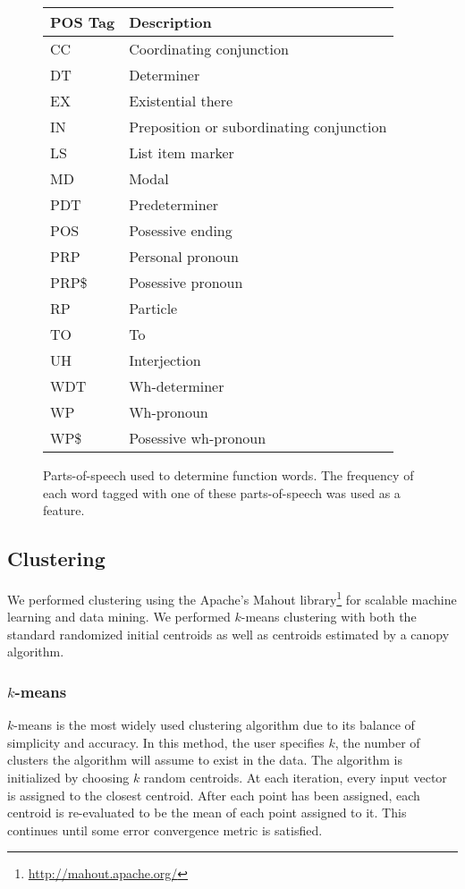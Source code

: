\documentclass[12pt]{article}
\begin{document}
\begin{figure}[h!]
\begin{center}
\begin{tabular}{ll}
\hline
{\bf POS Tag} & {\bf Description} \\ \hline
CC & Coordinating conjunction \\
DT & Determiner \\ 
EX & Existential there \\
IN & Preposition or subordinating conjunction \\
LS & List item marker \\
MD & Modal \\
PDT & Predeterminer \\
POS & Posessive ending \\
PRP & Personal pronoun \\
PRP\$ & Posessive pronoun \\
RP & Particle \\
TO & To \\
UH & Interjection \\
WDT & Wh-determiner \\
WP & Wh-pronoun \\
WP\$ & Posessive wh-pronoun
\end{tabular}
\caption{Parts-of-speech used to determine function words. The frequency of each word tagged with one of these parts-of-speech was used as a feature.}
\end{center}
\end{figure}
													
\subsection{Clustering}
We performed clustering using the Apache’s Mahout library\footnote{\protect\url{http://mahout.apache.org/}} for scalable machine learning and data mining. We performed $k$-means clustering with both the standard randomized initial centroids as well as centroids estimated by a canopy algorithm. 

\subsubsection{$k$-means}
$k$-means is the most widely used clustering algorithm due to its balance of simplicity and accuracy. In this method, the user specifies $k$, the number of clusters the algorithm will assume to exist in the data. The algorithm is initialized by choosing $k$ random centroids. At each iteration, every input vector is assigned to the closest centroid. After each point has been assigned, each centroid is re-evaluated to be the mean of each point assigned to it. This continues until some error convergence metric is satisfied.
\end{document}
